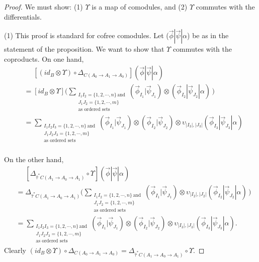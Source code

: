 \begin{proof}
We must show: (1) $\Upsilon$ is a map of comodules, and 
(2) $\Upsilon$ commutes with the differentials.

(1) This proof is standard for cofree comodules. 
Let ($\vec{\phi} | \vec{\psi} | \alpha$) be as 
in the statement of the proposition. We want to 
show that $\Upsilon$ commutes with the coproducts. 
On one hand,
\begin{align*}
&\phantom{{}={}}
[(id_B \otimes \Upsilon) \circ 
  \Delta_{C(A_0 \to A_1 \to A_0)}] 
  ( \vec{\phi} | \vec{\psi} | \alpha ) \\
&= [id_B \otimes \Upsilon]
	\big( \sum_{\substack{I_1I_2 = \{1,2,\cdots,n\} \, \textrm{and} \\ 
						  J_1J_2 = \{1,2,\cdots,m\} \\
				          \textrm{as ordered sets}}} 
    (\vec{\phi}_{I_1} | \vec{\psi}_{J_1}) \otimes (\vec{\phi}_{I_2} | \vec{\psi}_{J_2} | \alpha) \, \big) \\
&= \sum_{\substack{I_1I_2I_3 = \{1,2,\cdots,n\} \, \textrm{and} \\ 
				   J_1J_2J_3 = \{1,2,\cdots,m\} \\
				   \textrm{as ordered sets}}} 
    (\vec{\phi}_{I_1} | \vec{\psi}_{J_1}) \otimes 
    (\vec{\phi}_{I_2} | \vec{\psi}_{J_2}) \otimes 
    \upsilon_{|I_3|,|J_3|}(\vec{\phi}_{I_3} | \vec{\psi}_{J_3} | \alpha) \\
\end{align*}

On the other hand,
\begin{align*}
&\phantom{{}={}}
[\Delta_{\hat{\tau}^*C(A_1 \to A_0 \to A_1)} 
  \circ \Upsilon ]
  ( \vec{\phi} | \vec{\psi} | \alpha ) \\
&= \Delta_{\hat{\tau}^*C(A_1 \to A_0 \to A_1)}
	\big( \sum_{\substack{I_1I_2 = \{1,2,\cdots,n\} \, \textrm{and} \\ 
						  J_1J_2 = \{1,2,\cdots,m\} \\
				          \textrm{as ordered sets}}}
	(\vec{\phi}_{I_1} | \vec{\psi}_{J_1}) \otimes 
    \upsilon_{|I_2|,|J_2|}(\vec{\phi}_{I_2} | \vec{\psi}_{J_2} | \alpha) \, \big)\\
&= \sum_{\substack{I_1I_2I_3 = \{1,2,\cdots,n\} \, \textrm{and} \\ 
				   J_1J_2J_3 = \{1,2,\cdots,m\} \\
				   \textrm{as ordered sets}}} 
    (\vec{\phi}_{I_1} | \vec{\psi}_{J_1}) \otimes 
    (\vec{\phi}_{I_2} | \vec{\psi}_{J_2}) \otimes 
    \upsilon_{|I_3|,|J_3|}(\vec{\phi}_{I_3} | \vec{\psi}_{J_3} | \alpha).   				          
\end{align*}
Clearly $(id_B \otimes \Upsilon) \circ 
\Delta_{C(A_0 \to A_1 \to A_0)} = 
\Delta_{\hat{\tau}^*C(A_1 \to A_0 \to A_1)} 
\circ \Upsilon$.


\end{proof}
